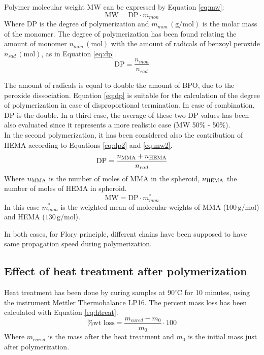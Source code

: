\documentclass[a4paper, 11pt]{article}
\begin{document}
Polymer molecular weight MW can be expressed by Equation \ref{eq:mw}:
\begin{equation}
\text{MW} = \text{DP}\cdot m_{mon}
\label{eq:mw} 
\end{equation}
Where DP is the degree of polymerization and $m_{mon}\,(\text{g}/\text{mol})$ is the molar mass of the monomer. The degree of polymerization has been found relating the amount of monomer $n_{mon}\,(\text{mol})$ with the amount of radicals of benzoyl peroxide $n_{rad}\,(\text{mol})$, as in Equation \ref{eq:dp}.
\begin{equation}
\text{DP} = \frac{n_{mon}}{n_{rad}}
\label{eq:dp} 
\end{equation}


The amount of radicals is equal to double the amount of BPO, due to the peroxide dissociation. Equation \ref{eq:dp} is suitable for the calculation of the degree of polymerization in case of disproportional termination. In case of combination, DP is the double. In a third case, the average of these two DP values has been also evaluated since it represents a more realistic case (MW 50\% - 50\%).\\
In the second polymerization, it has been considered also the contribution of HEMA according to Equations \ref{eq:dp2} and \ref{eq:mw2}.
\begin{equation}
\text{DP} = \frac{n_\textup{MMA} + n_\textup{HEMA}}{n_{rad}}
\label{eq:dp2} 
\end{equation}
Where $n_\textup{MMA}$ is the number of moles of MMA in the spheroid, $n_\textup{HEMA}$ the number of moles of HEMA in spheroid.
\begin{equation}
\text{MW} = \text{DP}\cdot m^*_{mon}
\label{eq:mw2} 
\end{equation}
In this case $m^*_{mon}$ is the weighted mean of molecular weights of MMA ($100\,\text{g/mol}$) and HEMA ($130\,\text{g/mol}$). \par 
In both cases, for Flory principle, different chains have been supposed to have same propagation speed during polymerization. 

\subsection{Effect of heat treatment after polymerization}

Heat treatment has been done by curing samples at $90^\circ$C for 10 minutes, using the instrument Mettler Thermobalance LP16. The percent mass loss has been calculated with Equation \ref{eq:htreat}.
\begin{equation}
\%\text{wt loss} = \frac{m_{cured}-m_0}{m_0}\cdot 100
\label{eq:htreat} 
\end{equation}
Where $m_{cured}$ is the mass after the heat treatment and $m_0$ is the initial mass just after polymerization. 
\end{document}
